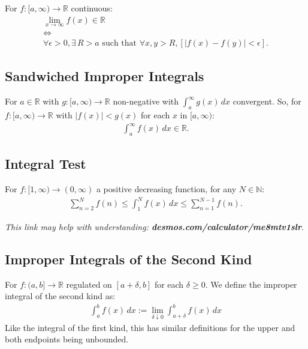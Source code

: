 \documentclass[a4paper, 12pt, twoside]{article}
\begin{document}
For $f:[a, \infty) \to \mathbb{R}$ continuous:
\begin{gather*}
      \lim_{x\to\infty}f(x) \in \mathbb{R} \\
      \Leftrightarrow \\
      \forall \epsilon > 0, \exists \, R > a \text{ such that }
      \forall x, y > R, [|f(x) - f(y)| < \epsilon].
\end{gather*}

\newpage

\subsection{Sandwiched Improper Integrals}

For $a \in \mathbb{R}$ with $g: [a, \infty) \to \mathbb{R}$
non-negative with $\int_a^\infty g(x) \, dx$ convergent. So, for
$f: [a, \infty) \to \mathbb{R}$ with $|f(x)| < g(x)$ for each $x$ in
$[a, \infty)$:
\begin{align*}
      \int_a^\infty f(x) \, dx \in \mathbb{R}.
\end{align*}

\subsection{Integral Test}

For $f : [1, \infty) \to (0, \infty)$ a positive decreasing function,
for any $N \in \mathbb{N}$:
\begin{align*}
      \sum_{n = 2}^N f(n) \leq \int_1^N f(x) \, dx
      \leq \sum_{n = 1}^{N - 1} f(n).
\end{align*}

\textit{This link may help  with understanding:
\textbf{desmos.com/calculator/me8mtv1slr}}.

\subsection{Improper Integrals of the Second Kind}

For $f:(a, b] \to \mathbb{R}$ regulated on $[a + \delta, b]$
for each $\delta \geq 0$. We define the improper integral
of the second kind as:
\begin{align*}
      \int_a^b f(x) \, dx :=
      \lim_{\delta\downarrow 0} \int_{a + \delta}^b f(x) \, dx
\end{align*}
Like the integral of the first kind, this has similar definitions
for the upper and both endpoints being unbounded.
\end{document}
